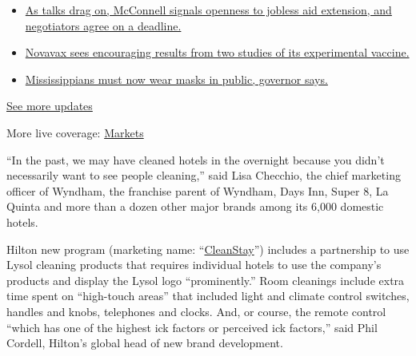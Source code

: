 \begin{itemize}
\tightlist
\item
  \href{https://www.nytimes3xbfgragh.onion/2020/08/04/world/coronavirus-cases.html?action=click\&pgtype=Article\&state=default\&region=MAIN_CONTENT_1\&context=storylines_live_updates\#link-762df92}{As
  talks drag on, McConnell signals openness to jobless aid extension,
  and negotiators agree on a deadline.}
\item
  \href{https://www.nytimes3xbfgragh.onion/2020/08/04/world/coronavirus-cases.html?action=click\&pgtype=Article\&state=default\&region=MAIN_CONTENT_1\&context=storylines_live_updates\#link-1228a480}{Novavax
  sees encouraging results from two studies of its experimental
  vaccine.}
\item
  \href{https://www.nytimes3xbfgragh.onion/2020/08/04/world/coronavirus-cases.html?action=click\&pgtype=Article\&state=default\&region=MAIN_CONTENT_1\&context=storylines_live_updates\#link-794484ed}{Mississippians
  must now wear masks in public, governor says.}
\end{itemize}

\href{https://www.nytimes3xbfgragh.onion/2020/08/04/world/coronavirus-cases.html?action=click\&pgtype=Article\&state=default\&region=MAIN_CONTENT_1\&context=storylines_live_updates}{See
more updates}

More live coverage:
\href{https://www.nytimes3xbfgragh.onion/live/2020/08/04/business/stock-market-today-coronavirus?action=click\&pgtype=Article\&state=default\&region=MAIN_CONTENT_1\&context=storylines_live_updates}{Markets}

``In the past, we may have cleaned hotels in the overnight because you
didn't necessarily want to see people cleaning,'' said Lisa Checchio,
the chief marketing officer of Wyndham, the franchise parent of Wyndham,
Days Inn, Super 8, La Quinta and more than a dozen other major brands
among its 6,000 domestic hotels.

Hilton new program (marketing name:
``\href{https://www.hilton.com/en/corporate/cleanstay/}{CleanStay}'')
includes a partnership to use Lysol cleaning products that requires
individual hotels to use the company's products and display the Lysol
logo ``prominently.'' Room cleanings include extra time spent on
``high-touch areas'' that included light and climate control switches,
handles and knobs, telephones and clocks. And, or course, the remote
control ``which has one of the highest ick factors or perceived ick
factors,'' said Phil Cordell, Hilton's global head of new brand
development.

